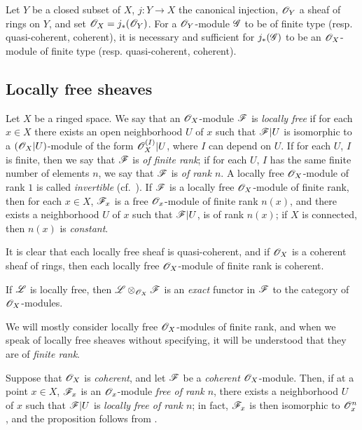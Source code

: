 \begin{env}[5.3.12]
\label{0.5.3.12}
Let $Y$ be a closed subset of $X$, $j:Y\to X$ the canonical injection, $\mathscr{O}_Y$ a sheaf of rings on $Y$, and set $\mathscr{O}_X=j_*(\mathscr{O}_Y)$.
For a $\mathscr{O}_Y$-module $\mathscr{G}$ to be of finite type (resp. quasi-coherent, coherent), it is necessary and sufficient for $j_*(\mathscr{G})$ to be an $\mathscr{O}_X$-module of finite type (resp. quasi-coherent, coherent).
\end{env}

\subsection{Locally free sheaves}
\label{subsection-locally-free-sheaves}

\begin{env}[5.4.1]
\label{0.5.4.1}
Let $X$ be a ringed space.
We say that an $\mathscr{O}_X$-module $\mathscr{F}$ is \emph{locally free} if for each $x\in X$ there exists an open neighborhood $U$ of $x$ such that $\mathscr{F}|U$ is isomorphic to a $(\mathscr{O}_X|U)$-module of the form $\mathscr{O}_X^{(I)}|U$, where $I$ can depend on $U$.
If for each $U$, $I$ is finite, then we say that $\mathscr{F}$ is \emph{of finite rank};
if for each $U$, $I$ has the same finite number of elements $n$, we say that $\mathscr{F}$ is \emph{of rank $n$}.
A locally free $\mathscr{O}_X$-module of rank $1$ is called \emph{invertible} (cf.~).
If $\mathscr{F}$ is a locally free $\mathscr{O}_X$-module of finite rank, then for each $x\in X$, $\mathscr{F}_x$ is a free $\mathscr{O}_x$-module of finite rank $n(x)$, and there exists a neighborhood $U$ of $x$ such that $\mathscr{F}|U$, is of rank $n(x)$;
if $X$ is connected, then $n(x)$ is \emph{constant}.

It is clear that each locally free sheaf is quasi-coherent, and if $\mathscr{O}_X$ is a coherent sheaf of rings, then each locally free $\mathscr{O}_X$-module of finite rank is coherent.

If $\mathscr{L}$ is locally free, then $\mathscr{L}\otimes_{\mathscr{O}_X}\mathscr{F}$ is an \emph{exact} functor in $\mathscr{F}$ to the category of $\mathscr{O}_X$-modules.

We will mostly consider locally free $\mathscr{O}_X$-modules of finite rank,
and when we speak of locally free sheaves without specifying, it will be understood that they are of \emph{finite rank}.

Suppose that $\mathscr{O}_X$ is \emph{coherent}, and let $\mathscr{F}$ be a \emph{coherent} $\mathscr{O}_X$-module.
Then, if at a point $x\in X$, $\mathscr{F}_x$ is an $\mathscr{O}_x$-module \emph{free of rank $n$}, there exists a neighborhood $U$ of $x$ such that $\mathscr{F}|U$ is \emph{locally free of rank $n$};
in fact, $\mathscr{F}_x$ is then isomorphic to $\mathscr{O}_x^n$, and the proposition follows from .
\end{env}

